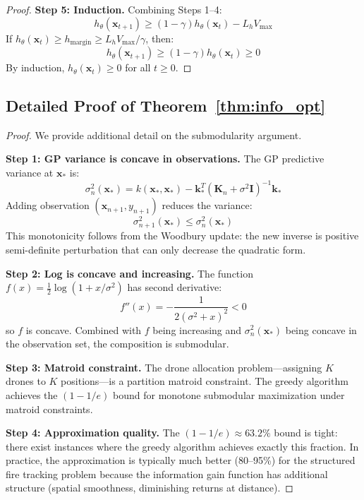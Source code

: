 \documentclass[12pt,a4paper]{article}
\DeclareRobustCommand{\vect}[1]{\bm{#1}}
\DeclareRobustCommand{\mat}[1]{\bm{#1}}
\begin{document}
\begin{proof}
\textbf{Step 5: Induction.} Combining Steps 1--4:
\begin{equation}
    h_\theta(\vect{x}_{t+1}) \geq (1-\gamma) h_\theta(\vect{x}_t) - L_h V_{\max}
\end{equation}
If $h_\theta(\vect{x}_t) \geq h_{\text{margin}} \geq L_h V_{\max} / \gamma$, then:
\begin{equation}
    h_\theta(\vect{x}_{t+1}) \geq (1-\gamma) h_\theta(\vect{x}_t) \geq 0
\end{equation}
By induction, $h_\theta(\vect{x}_t) \geq 0$ for all $t \geq 0$.
\end{proof}

\subsection{Detailed Proof of Theorem~\ref{thm:info_opt}}

\begin{proof}
We provide additional detail on the submodularity argument.

\textbf{Step 1: GP variance is concave in observations.} The GP predictive variance at $\vect{x}_*$ is:
\begin{equation}
    \sigma^2_n(\vect{x}_*) = k(\vect{x}_*, \vect{x}_*) - \vect{k}_*^T(\mat{K}_n + \sigma^2\mat{I})^{-1}\vect{k}_*
\end{equation}
Adding observation $(\vect{x}_{n+1}, y_{n+1})$ reduces the variance:
\begin{equation}
    \sigma^2_{n+1}(\vect{x}_*) \leq \sigma^2_n(\vect{x}_*)
\end{equation}
This monotonicity follows from the Woodbury update: the new inverse is positive semi-definite perturbation that can only decrease the quadratic form.

\textbf{Step 2: Log is concave and increasing.} The function $f(x) = \frac{1}{2}\log(1 + x/\sigma^2)$ has second derivative:
\begin{equation}
    f''(x) = -\frac{1}{2(\sigma^2 + x)^2} < 0
\end{equation}
so $f$ is concave. Combined with $f$ being increasing and $\sigma^2_n(\vect{x}_*)$ being concave in the observation set, the composition is submodular.

\textbf{Step 3: Matroid constraint.} The drone allocation problem---assigning $K$ drones to $K$ positions---is a partition matroid constraint. The greedy algorithm achieves the $(1-1/e)$ bound for monotone submodular maximization under matroid constraints.

\textbf{Step 4: Approximation quality.} The $(1-1/e) \approx 63.2\%$ bound is tight: there exist instances where the greedy algorithm achieves exactly this fraction. In practice, the approximation is typically much better (80--95\%) for the structured fire tracking problem because the information gain function has additional structure (spatial smoothness, diminishing returns at distance).
\end{proof}
\end{document}
